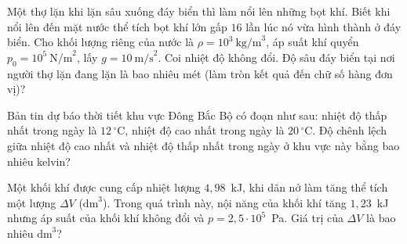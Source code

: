 	\begin{ex}%
		Một thợ lặn khi lặn sâu xuống đáy biển thì làm nổi lên những bọt khí. Biết khi nổi lên đến mặt nước thể tích bọt khí lớn gấp $16$ lần lúc nó vừa hình thành ở đáy biển. Cho khối lượng riêng của nước là $\rho=10^3~\text{kg/m}^3$, áp suất khí quyển $p_0=10^5~\text{N/m}^2$, lấy $g=10~\text{m/s}^2$. Coi nhiệt độ không đổi. Độ sâu đáy biển tại nơi người thợ lặn đang lặn là bao nhiêu mét (làm tròn kết quả đến chữ số hàng đơn vị)?
		\par
	\end{ex}

	\begin{ex}%
		Bản tin dự báo thời tiết khu vực Đông Bắc Bộ có đoạn như sau: nhiệt độ thấp nhất trong ngày là $12\,^\circ\text{C}$, nhiệt độ cao nhất trong ngày là $20\,^\circ\text{C}$. Độ chênh lệch giữa nhiệt độ cao nhất và nhiệt độ thấp nhất trong ngày ở khu vực này bằng bao nhiêu kelvin?
		\par
	\end{ex}

	\begin{ex}%
		Một khối khí được cung cấp nhiệt lượng $4{,}98$~kJ, khi dãn nở làm tăng thể tích một lượng $\Delta V$ ($\text{dm}^3$). Trong quá trình này, nội năng của khối khí tăng $1{,}23$~kJ nhưng áp suất của khối khí không đổi và $p=2{,}5\cdot 10^5$~Pa. Giá trị của $\Delta V$ là bao nhiêu $\text{dm}^3$?
		\par
	\end{ex}

